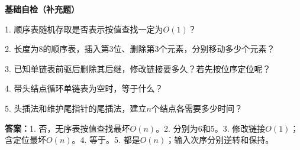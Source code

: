 \hypertarget{ds2-recall}{}

\begin{recallcard}[用条件检验结论]
\textbf{基础自检（补充题）}

1. 顺序表随机存取是否表示按值查找一定为$O(1)$？\par
2. 长度为8的顺序表，插入第3位、删除第3个元素，分别移动多少个元素？\par
3. 已知单链表前驱后删除其后继，修改链接要多久？若先按位序定位呢？\par
4. 带头结点循环单链表为空时，等于什么？\par
5. 头插法和维护尾指针的尾插法，建立$n$个结点各需要多少时间？

\textbf{答案：}1. 否，无序表按值查找最坏$O(n)$。2. 分别为6和5。3. 修改链接$O(1)$；含定位最坏$O(n)$。4. 等于。5. 都是$O(n)$；输入次序分别逆转和保持。
\end{recallcard}

